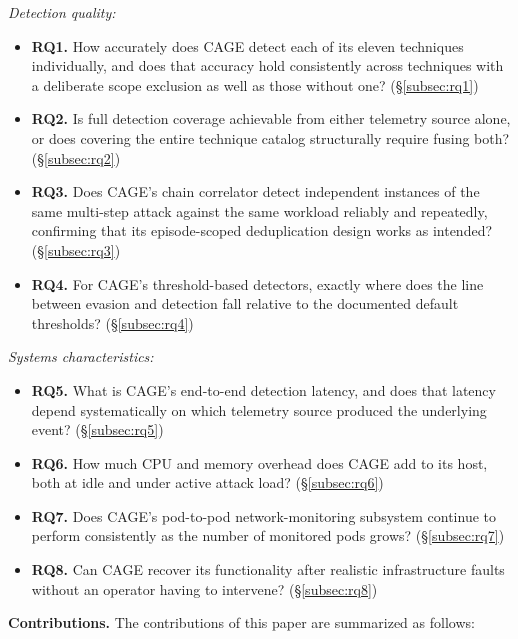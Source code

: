 \documentclass{ieeeaccess}
\begin{document}
\emph{Detection quality:}
\begin{itemize}
\item \textbf{RQ1.} How accurately does CAGE detect each of its eleven
  techniques individually, and does that accuracy hold consistently
  across techniques with a deliberate scope exclusion as well as those
  without one? (\S\ref{subsec:rq1})
\item \textbf{RQ2.} Is full detection coverage achievable from either telemetry
  source alone, or does covering the entire technique catalog
  structurally require fusing both? (\S\ref{subsec:rq2})
\item \textbf{RQ3.} Does CAGE's chain correlator detect independent instances of
  the same multi-step attack against the same workload reliably and
  repeatedly, confirming that its episode-scoped deduplication design
  works as intended? (\S\ref{subsec:rq3})
\item \textbf{RQ4.} For CAGE's threshold-based detectors, exactly where does the
  line between evasion and detection fall relative to the documented
  default thresholds? (\S\ref{subsec:rq4})
\end{itemize}

\emph{Systems characteristics:}
\begin{itemize}
\item \textbf{RQ5.} What is CAGE's end-to-end detection latency, and does that
  latency depend systematically on which telemetry source produced the
  underlying event? (\S\ref{subsec:rq5})
\item \textbf{RQ6.} How much CPU and memory overhead does CAGE add to its host,
  both at idle and under active attack load? (\S\ref{subsec:rq6})
\item \textbf{RQ7.} Does CAGE's pod-to-pod network-monitoring subsystem continue
  to perform consistently as the number of monitored pods grows? (\S\ref{subsec:rq7})
\item \textbf{RQ8.} Can CAGE recover its functionality after realistic
  infrastructure faults without an operator having to intervene?
  (\S\ref{subsec:rq8})
\end{itemize}

\textbf{Contributions.} The contributions of this paper are summarized as
follows:
\end{document}

